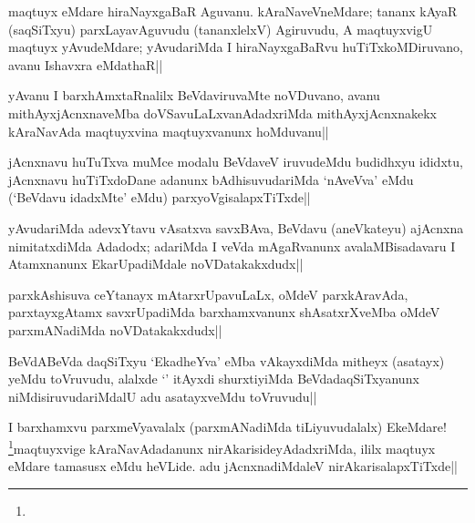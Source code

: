 \begin{artha} 
maqtuyx eMdare hiraNayxgaBaR Aguvanu. kAraNaveVneMdare; tananx kAyaR 
(saqSiTxyu) parxLayavAguvudu (tananxlelxV) Agiruvudu, A maqtuyxvigU 
maqtuyx yAvudeMdare; yAvudariMda I hiraNayxgaBaRvu huTiTxkoMDiruvano, 
avanu Ishavxra eMdathaR||
\end{artha}

\begin{artha} 
yAvanu I barxhAmxtaRnalilx BeVdaviruvaMte noVDuvano, avanu 
mithAyxjAcnxnaveMba doVSavuLaLxvanAdadxriMda mithAyxjAcnxnakekx 
kAraNavAda maqtuyxvina maqtuyxvanunx hoMduvanu||
\end{artha}


\begin{artha} 
jAcnxnavu huTuTxva muMce modalu BeVdaveV iruvudeMdu budidhxyu ididxtu, 
jAcnxnavu huTiTxdoDane adanunx bAdhisuvudariMda `nAveVva' eMdu 
(`BeVdavu idadxMte' eMdu) parxyoVgisalapxTiTxde||
\end{artha}


\begin{artha} 
yAvudariMda adevxYtavu vAsatxva savxBAva, BeVdavu (aneVkateyu) 
ajAcnxna nimitatxdiMda Adadodx; adariMda I veVda mAgaRvanunx 
avalaMBisadavaru I Atamxnanunx EkarUpadiMdale noVDatakakxdudx||
\end{artha}

\begin{artha} 
parxkAshisuva ceYtanayx mAtarxrUpavuLaLx, oMdeV parxkAravAda, 
parxtayxgAtamx savxrUpadiMda barxhamxvanunx shAsatxrXveMba oMdeV 
parxmANadiMda noVDatakakxdudx||
\end{artha}


\begin{artha} 
BeVdABeVda daqSiTxyu `EkadheYva' eMba vAkayxdiMda mitheyx (asatayx) 
yeMdu toVruvudu, alalxde `\stext' itAyxdi shurxtiyiMda 
BeVdadaqSiTxyanunx niMdisiruvudariMdalU adu asatayxveMdu toVruvudu||
\end{artha}


\begin{artha} 
I barxhamxvu parxmeVyavalalx (parxmANadiMda tiLiyuvudalalx) EkeMdare! 
\footnote[1]{}maqtuyxvige kAraNavAdadanunx nirAkarisideyAdadxriMda, 
ililx maqtuyx eMdare tamasusx eMdu heVLide. adu jAcnxnadiMdaleV 
nirAkarisalapxTiTxde||
\end{artha}

